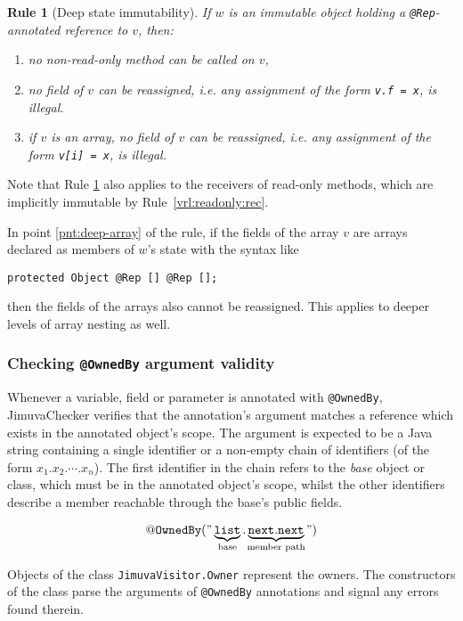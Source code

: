 \documentclass{pracamgr}
\theoremstyle{break}
\theoremstyle{break}
\theoremstyle{break}
\newtheorem{verrule}{Rule}
\begin{document}
\begin{verrule}[Deep state immutability] \label{vrl:deepimm}
  If $w$ is an immutable object holding a \texttt{@Rep}-annotated
  reference to $v$, then:
  \begin{enumerate}[label=(\arabic*)]
  \item no non-read-only method can be called on $v$, 
  \item no field of $v$ can be reassigned, i.e. any assignment of the
    form \texttt{v.f~=~x}, is illegal.
  \item \label{pnt:deep-array} if $v$ is an array, no field of $v$ can
    be reassigned, i.e. any assignment of the form \texttt{v[i]~=~x},
    is illegal.
  \end{enumerate}
\end{verrule}
Note that Rule \ref{vrl:deepimm} also applies to the receivers of
read-only methods, which are implicitly immutable by
Rule~\ref{vrl:readonly:rec}. 

In point \ref{pnt:deep-array} of the rule, if the fields of the
array $v$ are arrays declared as members of $w$'s state with the
syntax like
\begin{center}
  \texttt{protected Object @Rep [] @Rep [];}
\end{center}
then the fields of the arrays also cannot be reassigned. This applies
to deeper levels of array nesting as well. 

\subsubsection{Checking \texttt{@OwnedBy} argument validity} 

Whenever a variable, field or parameter is annotated with
\texttt{@OwnedBy}, JimuvaChecker verifies that the annotation's
argument matches a reference which exists in the annotated object's
scope. The argument is expected to be a Java string containing a
single identifier or a non-empty chain of identifiers (of the form
$x_1.x_2.\cdots.x_n$). The first identifier in the chain refers to the
\emph{base} object or class, which must be in the annotated object's
scope, whilst the other identifiers describe a member reachable
through the base's public fields.

$$ \mathtt{@OwnedBy("}\underbrace{\mathtt{list}}_{\mathclap{\textrm{base}}} 
\mathtt{.}
\underbrace{\mathtt{next.next}}_{\mathclap{\textrm{member path}}}\mathtt{")} $$

Objects of the class
\texttt{JimuvaVisitor.Owner} represent the owners. The constructors of
the class parse the arguments of \texttt{@OwnedBy} annotations and
signal any errors found therein.
\end{document}

